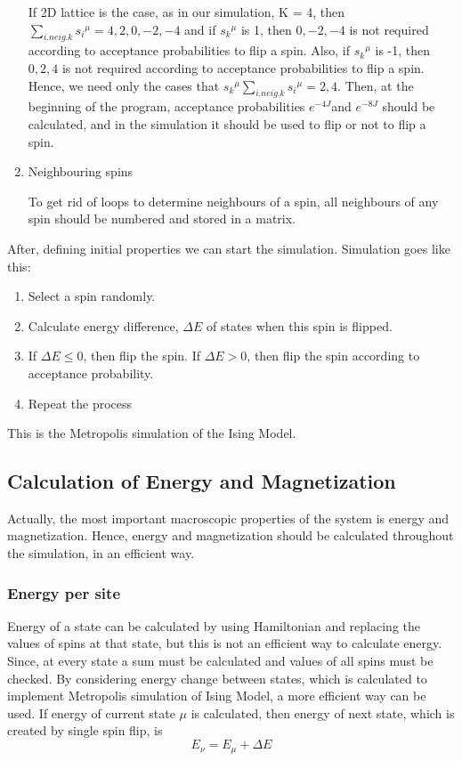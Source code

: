 \documentclass[12pt,fleqn]{report}
\begin{document}
\begin{enumerate}
If 2D lattice is the case, as in our simulation, K = 4, then $ 
\sum\limits_{i.neig.k} {s_i}^\mu  = 4, 2, 0, -2, -4 $ and if ${s_k}^\mu$ is 
1, then $0, -2, -4 $ is not required according to acceptance probabilities to 
flip a spin. Also, if  ${s_k}^\mu$ is -1, then $0, 2, 4 $ is not required 
according to acceptance probabilities to flip a spin. Hence, we need only 
the cases that ${s_k}^\mu \sum\limits_{i.neig.k} {s_i}^\mu = 2,4$. Then, at 
the beginning of the program, acceptance probabilities $e^{-4J} $and 
$e^{-8J} $ should be calculated, and in the simulation it should be used to 
flip or not to flip a spin.

\item Neighbouring spins

To get rid of loops to determine neighbours of a spin, all neighbours of any 
spin should be numbered and stored in a matrix.

\end{enumerate}

After, defining initial properties we can start the simulation. Simulation 
goes like this: 

\begin{enumerate}
\item Select a spin randomly.
\item Calculate energy difference, $\Delta E$ of states when this spin is 
flipped.
\item If $\Delta E \leq 0$, then flip the spin. If $\Delta E > 0$, then flip the 
spin according to acceptance probability.
\item Repeat the process
\end{enumerate}
This is the Metropolis simulation of the Ising Model. 

\subsection{Calculation of Energy and Magnetization}

Actually, the most important macroscopic properties of the system is 
energy and magnetization. Hence, energy and magnetization should be 
calculated throughout the simulation, in an efficient way. 

\subsubsection{Energy per site}

Energy of a state can be calculated by using Hamiltonian and replacing the 
values of spins at that state, but this is not an efficient way to calculate 
energy. Since, at every state a sum must be calculated and values of all 
spins must be checked. By considering energy change between states, 
which is calculated to implement Metropolis simulation of Ising Model, a 
more efficient way can be used. If energy of current state $\mu$ is 
calculated, then energy of next state, which is created by single spin flip, is 
\begin{equation}
E_\nu = E_\mu + \Delta E
\end{equation}
\end{document}
